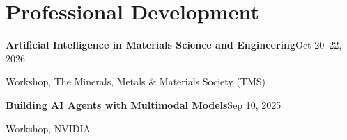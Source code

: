 \section{Professional Development}
\textbf{Artificial Intelligence in Materials Science and Engineering}\hfill Oct 20--22, 2026\par
Workshop, The Minerals, Metals \& Materials Society (TMS)

\vspace{0.4em}
\textbf{Building AI Agents with Multimodal Models}\hfill Sep 10, 2025\par
Workshop, NVIDIA
